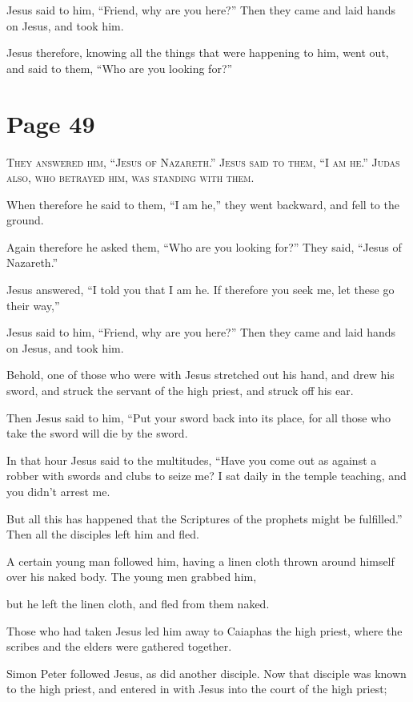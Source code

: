 Jesus said to him, “Friend, why are you here?” Then they came and laid hands on Jesus, and took him.

Jesus therefore, knowing all the things that were happening to him, went out, and said to them, “Who are you looking for?”



\chapterornament
\section*{Page 49}

\lettrine{T}{hey answered him, “Jesus of Nazareth.” Jesus said to them, “I am he.” Judas also, who betrayed him, was standing with them.}

When therefore he said to them, “I am he,” they went backward, and fell to the ground.

Again therefore he asked them, “Who are you looking for?” They said, “Jesus of Nazareth.”

Jesus answered, “I told you that I am he. If therefore you seek me, let these go their way,”

Jesus said to him, “Friend, why are you here?” Then they came and laid hands on Jesus, and took him.

Behold, one of those who were with Jesus stretched out his hand, and drew his sword, and struck the servant of the high priest, and struck off his ear.

Then Jesus said to him, “Put your sword back into its place, for all those who take the sword will die by the sword.

In that hour Jesus said to the multitudes, “Have you come out as against a robber with swords and clubs to seize me? I sat daily in the temple teaching, and you didn’t arrest me.

But all this has happened that the Scriptures of the prophets might be fulfilled.” Then all the disciples left him and fled.

A certain young man followed him, having a linen cloth thrown around himself over his naked body. The young men grabbed him,

but he left the linen cloth, and fled from them naked.

Those who had taken Jesus led him away to Caiaphas the high priest, where the scribes and the elders were gathered together.

Simon Peter followed Jesus, as did another disciple. Now that disciple was known to the high priest, and entered in with Jesus into the court of the high priest;

